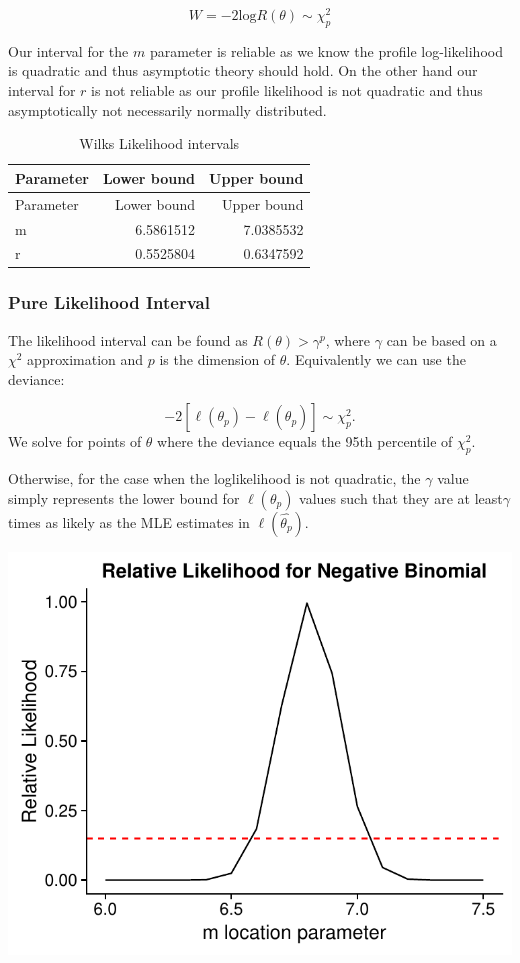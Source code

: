 \documentclass[11pt,preprint, authoryear]{elsarticle}
\numberwithin{equation}{section}
\numberwithin{figure}{section}
\numberwithin{table}{section}
\begin{document}
\[W = -2\text{log}R(\theta) \sim \chi^2_p\]

Our interval for the \(m\) parameter is reliable as we know the profile
log-likelihood is quadratic and thus asymptotic theory should hold. On
the other hand our interval for \(r\) is not reliable as our profile
likelihood is not quadratic and thus asymptotically not necessarily
normally distributed.

\begin{longtable}[]{@{}lrr@{}}
\caption{Wilks Likelihood intervals}\tabularnewline
\toprule
Parameter & Lower bound & Upper bound\tabularnewline
\midrule
\endfirsthead
\toprule
Parameter & Lower bound & Upper bound\tabularnewline
\midrule
\endhead
m & 6.5861512 & 7.0385532\tabularnewline
r & 0.5525804 & 0.6347592\tabularnewline
\bottomrule
\end{longtable}

\subsubsection{Pure Likelihood Interval}\label{pure-likelihood-interval}

The likelihood interval can be found as \(R(\theta) > \gamma^p\), where
\(\gamma\) can be based on a \(\chi^2\) approximation and \(p\) is the
dimension of \(\theta\). Equivalently we can use the deviance:

\[ -2[\ell(\theta_p) - \ell(\hat{\theta_p})] \sim \chi^2_p. \] We solve
for points of \(\theta\) where the deviance equals the 95th percentile
of \(\chi^2_p\).

Otherwise, for the case when the loglikelihood is not quadratic, the
\(\gamma\) value simply represents the lower bound for
\(\ell{(\theta_p)}\) values such that they are at least\(\gamma\) times
as likely as the MLE estimates in \(\ell{(\hat{\theta_p})}\).

\includegraphics{likelihood_files/figure-latex/unnamed-chunk-7-1.pdf}
\end{document}
